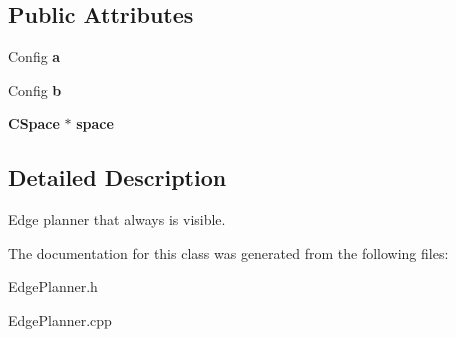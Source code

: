 \subsection*{Public Attributes}
\begin{DoxyCompactItemize}
\item 
Config {\bfseries a}\label{classTrueEdgePlanner_a67ad4fda81bf524be1e6ec195603ecbc}

\item 
Config {\bfseries b}\label{classTrueEdgePlanner_a0e46198c3ebefbbc111a3bec99973f7d}

\item 
{\bf C\+Space} $\ast$ {\bfseries space}\label{classTrueEdgePlanner_a81296d34561ee07285a98a28abbc0cbe}

\end{DoxyCompactItemize}


\subsection{Detailed Description}
Edge planner that always is visible. 

The documentation for this class was generated from the following files\+:\begin{DoxyCompactItemize}
\item 
Edge\+Planner.\+h\item 
Edge\+Planner.\+cpp\end{DoxyCompactItemize}
